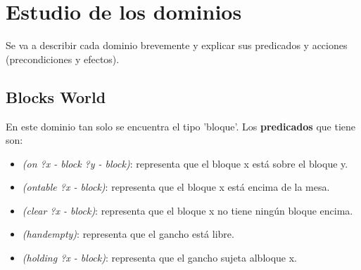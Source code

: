 \documentclass{uc3mpracticas}
\begin{document}
  \frontmatter



  \vspace{55mm}


  \newpage

  \tableofcontents

  \newpage

  \mainmatter

  \section{Estudio de los dominios}

  Se va a describir cada dominio brevemente y explicar sus predicados y acciones (precondiciones y efectos).

  \subsection{Blocks World}

  En este dominio tan solo se encuentra el tipo 'bloque'. Los \textbf{predicados} que tiene son:
  \begin{itemize}
    \item \textit{(on ?x - block ?y - block)}: representa que el bloque x está sobre el bloque y.
  	\item \textit{(ontable ?x - block)}: representa que el bloque x está encima de la mesa.
  	\item \textit{(clear ?x - block)}: representa que el bloque x no tiene ningún bloque encima.
  	\item \textit{(handempty)}: representa que el gancho está libre.
  	\item \textit{(holding ?x - block)}: representa que el gancho sujeta albloque x.
  \end{itemize}
\end{document}
